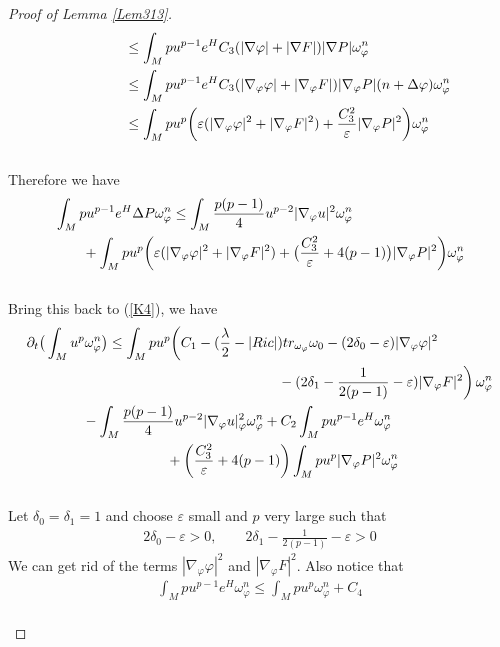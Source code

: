 \documentclass[11pt]{amsart}
\numberwithin{equation}{section}
\newcommand \eps{\varepsilon}
\begin{document}
\begin{proof}[Proof of Lemma \ref{Lem313}]
\begin{align}
	& \qquad\qquad \le  \int_M p u^{p-1} e^H C_3( |\nabla \varphi| + |\nabla F|) |\nabla P| \omega_{\varphi}^n \notag\\
	& \qquad\qquad   \le  \int_M p u^{p-1} e^H C_3( |\nabla_\varphi \varphi| + |\nabla_\varphi F|) |\nabla_\varphi P|(n+\Delta\varphi) \omega_{\varphi}^n \notag\\
	&\qquad\qquad \le  \int_M pu^p\bigg(\eps ( |\nabla_\varphi \varphi|^2 + |\nabla_\varphi F|^2)+ \frac{C_3^2}{\eps} |\nabla_\varphi P|^2 \bigg) \omega_\varphi^n
\end{align}\\
Therefore we have 
\begin{align}
	& \int_M p u^{p-1} e^H \Delta P \omega_{\varphi}^n \le  \int_M \frac{p(p-1)}{4} u^{p-2} |\nabla_{\varphi} u|^2 \omega_{\varphi}^n \notag\\
	&\qquad + \int_M pu^p\bigg(\eps ( |\nabla_\varphi \varphi|^2 + |\nabla_\varphi F|^2)+ \big(\frac{C_3^2}{\eps}+4(p-1)\big) |\nabla_\varphi P|^2 \bigg) \omega_\varphi^n
\end{align}\\
Bring this back to (\ref{K4}), we have 
\begin{align}
	&\partial_t\big( \int_M u^p\omega_\varphi^n\big)\le  \int_M pu^p \bigg(C_1 - (\frac{\lambda}{2}-|Ric|)tr_{\omega_{\varphi}}\omega_0 - (2\delta_0-\eps) |\nabla_{\varphi}\varphi|^2 \notag \\
	&\qquad\qquad\qquad\qquad\qquad\qquad\qquad\qquad\qquad - (2\delta_1-\frac{1}{2(p-1)}-\eps ) |\nabla_{\varphi}F|^2 \bigg)\,\omega_\varphi^n \notag\\
	&\qquad\qquad - \int_M \frac{p(p-1)}{4} u^{p-2} |\nabla_\varphi u|^2_\varphi\omega_\varphi^n +C_2 \int_M pu^{p-1}e^H \omega_\varphi^n \notag\\
	&\qquad\qquad\qquad\qquad\qquad + \bigg(\frac{C_3^2}{\eps}+4(p-1)\bigg) \int_M p u^p |\nabla_{\varphi} P|^2 \omega_{\varphi}^n 
\end{align}\\
Let $\delta_0=\delta_1=1$ and choose $\eps$ small and $p$ very large such that 
\begin{align}
	2\delta_0-\eps>0,\qquad 2\delta_1-\frac{1}{2(p-1)}-\eps >0
\end{align}
We can get rid of the terms $|\nabla_\varphi\varphi|^2$ and $|\nabla_\varphi F|^2$. Also notice that 
\begin{align}
	\int_M pu^{p-1}e^H \omega_\varphi^n \le  \int_M pu^{p} \omega_\varphi^n +C_4
\end{align}\\

\end{proof}
\end{document}
